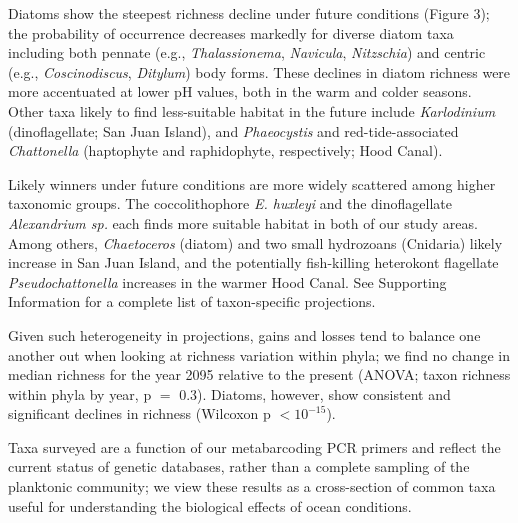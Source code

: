 \documentclass[11pt]{article}
\begin{document}
\begin{linenumbers}
Diatoms show the steepest richness decline under future conditions (Figure 3); the probability of occurrence decreases markedly for diverse diatom taxa including both pennate (e.g., \textit{Thalassionema}, \textit{Navicula}, \textit{Nitzschia}) and centric (e.g., \textit{Coscinodiscus}, \textit{Ditylum}) body forms. These declines in diatom richness were more accentuated at lower pH values, both in the warm and colder seasons. Other taxa likely to find less-suitable habitat in the future include \textit{Karlodinium} (dinoflagellate; San Juan Island), and \textit{Phaeocystis} and red-tide-associated \textit{Chattonella} (haptophyte and raphidophyte, respectively; Hood Canal). 

Likely winners under future conditions are more widely scattered among higher taxonomic groups. The coccolithophore \textit{E. huxleyi} and the dinoflagellate \textit{Alexandrium sp.} each finds more suitable habitat in both of our study areas. Among others, \textit{Chaetoceros} (diatom) and two small hydrozoans (Cnidaria) likely increase in San Juan Island, and the potentially fish-killing heterokont flagellate \textit{Pseudochattonella} increases in the warmer Hood Canal. See Supporting Information for a complete list of taxon-specific projections.

Given such heterogeneity in projections, gains and losses tend to balance one another out when looking at richness variation within phyla; we find no change in median richness for the year 2095 relative to the present (ANOVA; taxon richness within phyla by year, p $=$ 0.3). Diatoms, however, show consistent and significant declines in richness (Wilcoxon p $< 10^{-15}$). 

Taxa surveyed are a function of our metabarcoding PCR primers \cite{leray_new_2013} and reflect the current status of genetic databases, rather than a complete sampling of the planktonic community; we view these results as a cross-section of common taxa useful for understanding the biological effects of ocean conditions.
 


\end{linenumbers}
\end{document}
